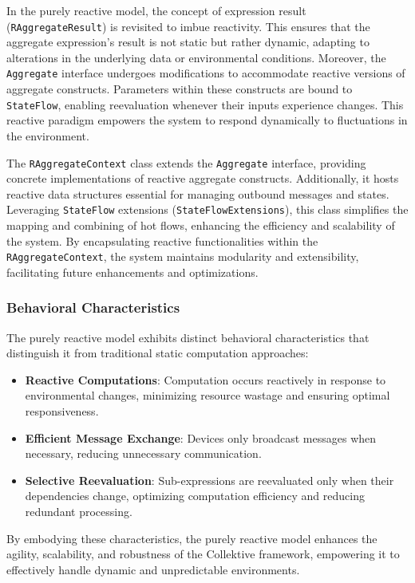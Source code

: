 In the purely reactive model, the concept of expression result (\texttt{RAggregateResult}) is revisited to imbue reactivity. This ensures that the aggregate expression's result is not static but rather dynamic, adapting to alterations in the underlying data or environmental conditions. Moreover, the \texttt{Aggregate} interface undergoes modifications to accommodate reactive versions of aggregate constructs. Parameters within these constructs are bound to \texttt{StateFlow}, enabling reevaluation whenever their inputs experience changes. This reactive paradigm empowers the system to respond dynamically to fluctuations in the environment.

The \texttt{RAggregateContext} class extends the \texttt{Aggregate} interface, providing concrete implementations of reactive aggregate constructs. Additionally, it hosts reactive data structures essential for managing outbound messages and states. Leveraging \texttt{StateFlow} extensions (\texttt{StateFlowExtensions}), this class simplifies the mapping and combining of hot flows, enhancing the efficiency and scalability of the system. By encapsulating reactive functionalities within the \texttt{RAggregateContext}, the system maintains modularity and extensibility, facilitating future enhancements and optimizations.

\subsubsection{Behavioral Characteristics}

The purely reactive model exhibits distinct behavioral characteristics that distinguish it from traditional static computation approaches:

\begin{itemize}
    \item \textbf{Reactive Computations}: Computation occurs reactively in response to environmental changes, minimizing resource wastage and ensuring optimal responsiveness.
    \item \textbf{Efficient Message Exchange}: Devices only broadcast messages when necessary, reducing unnecessary communication.
    \item \textbf{Selective Reevaluation}: Sub-expressions are reevaluated only when their dependencies change, optimizing computation efficiency and reducing redundant processing.
\end{itemize}

By embodying these characteristics, the purely reactive model enhances the agility, scalability, and robustness of the Collektive framework, empowering it to effectively handle dynamic and unpredictable environments.

